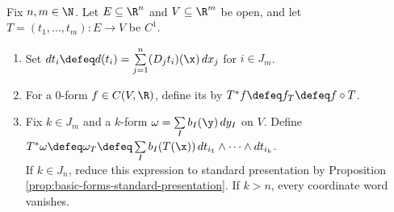 \begin{definition} \label{def:pullback-of-differential-form} \\
Fix $n,m\in\N$. Let $E\subseteq\R^n$ and $V\subseteq\R^m$ be open, and let $T=(t_1,\ldots,t_m):E\to V$ be $C^1$.
\begin{enumerate}[label=(\roman*)]
\setlength{\itemsep}{0pt}
\item Set $dt_i\defeq d(t_i)=\sum\limits_{j=1}^{n}(D_jt_i)(\x)\,dx_j$ for $i\in J_m$.
\item For a $0$-form $f\in C(V,\R)$, define its  by $T^\ast f\defeq f_T\defeq f\circ T$.
\item Fix $k\in J_m$ and a $k$-form $\omega=\sum\limits_I b_I(\y)\,dy_I$ on $V$. Define $T^\ast\omega\defeq\omega_T\defeq\sum\limits_I b_I(T(\x))\,dt_{i_1}\wedge\cdots\wedge dt_{i_k}$.\\
If $k\in J_n$, reduce this expression to standard presentation by Proposition \ref{prop:basic-forms-standard-presentation}. If $k>n$, every coordinate word vanishes.
\end{enumerate}
\end{definition}


